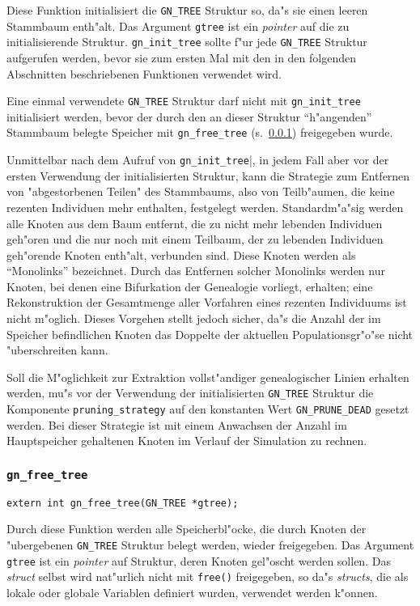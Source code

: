 \documentclass[a4paper, fleqn]{article}
\begin{document}
Diese Funktion initialisiert die \verb|GN_TREE| Struktur so, da"s sie
einen leeren Stammbaum enth"alt. Das Argument \verb|gtree| ist ein
\textsl{pointer} auf die zu initialisierende Struktur.
\verb|gn_init_tree| sollte f"ur jede \verb|GN_TREE| Struktur aufgerufen
werden, bevor sie zum ersten Mal mit den in den folgenden Abschnitten
beschriebenen Funktionen verwendet wird.

Eine einmal verwendete \verb|GN_TREE| Struktur darf nicht mit
\verb|gn_init_tree| initialisiert werden, bevor der durch den an dieser Struktur
"`h"angenden"' Stammbaum belegte Speicher mit \verb|gn_free_tree|
(s.\ \ref{gn_free_tree}) freigegeben wurde.

Unmittelbar nach dem Aufruf von \verb|gn_init_tree||, in jedem Fall aber
vor der ersten Verwendung der initialisierten Struktur, kann die Strategie zum
Entfernen von "abgestorbenen Teilen" des Stammbaums, also von Teilb"aumen,
die keine rezenten Individuen mehr enthalten, festgelegt werden. Standardm"a"sig
werden alle Knoten aus dem Baum entfernt, die zu nicht mehr lebenden Individuen
geh"oren und die nur noch mit einem Teilbaum, der zu lebenden Individuen
geh"orende Knoten enth"alt, verbunden sind. Diese Knoten werden als
"`Monolinks"' bezeichnet. Durch das Entfernen solcher Monolinks werden nur
Knoten, bei denen eine Bifurkation der Genealogie vorliegt, erhalten; eine
Rekonstruktion der Gesamtmenge aller Vorfahren eines rezenten Individuums
ist nicht m"oglich. Dieses Vorgehen stellt jedoch sicher, da"s die Anzahl
der im Speicher befindlichen Knoten das Doppelte der aktuellen Populationsgr"o"se
nicht "uberschreiten kann.

Soll die M"oglichkeit zur Extraktion vollst"andiger genealogischer Linien
erhalten werden, mu"s vor der Verwendung der initialisierten \verb|GN_TREE|
Struktur die Komponente \verb|pruning_strategy| auf den konstanten Wert
\verb|GN_PRUNE_DEAD| gesetzt werden. Bei dieser Strategie ist mit einem
Anwachsen der Anzahl im Hauptspeicher gehaltenen Knoten im Verlauf der
Simulation zu rechnen.


\subsubsection{\texttt{gn\_free\_tree}}
\label{gn_free_tree}

\begin{verbatim}
extern int gn_free_tree(GN_TREE *gtree);
\end{verbatim}

Durch diese Funktion werden alle Speicherbl"ocke, die durch Knoten der
"ubergebenen \verb|GN_TREE| Struktur belegt werden, wieder
freigegeben.  Das Argument \verb|gtree| ist ein \textsl{pointer} auf
Struktur, deren Knoten gel"oscht werden sollen.  Das \textsl{struct}
selbst wird nat"urlich nicht mit \verb|free()| freigegeben, so da"s
\textsl{structs}, die als lokale oder globale Variablen definiert
wurden, verwendet werden k"onnen.
\end{document}
